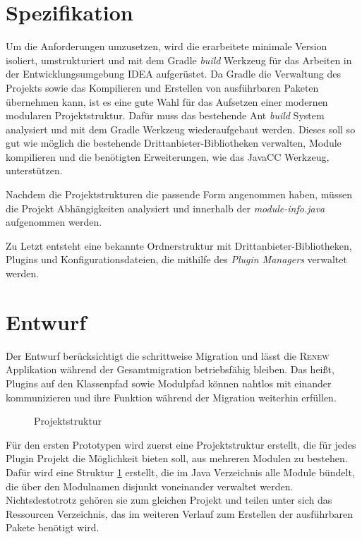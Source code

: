 \section{Spezifikation}
	Um die Anforderungen umzusetzen, wird die erarbeitete minimale Version isoliert, umstrukturiert und mit dem Gradle \textit{build} Werkzeug für das Arbeiten in der Entwicklungsumgebung IDEA aufgerüstet. Da Gradle die Verwaltung des Projekts sowie das Kompilieren und Erstellen von ausführbaren Paketen übernehmen kann, ist es eine gute Wahl für das Aufsetzen einer modernen modularen Projektstruktur.\newline 
	Dafür muss das bestehende Ant \textit{build} System analysiert und mit dem Gradle Werkzeug wiederaufgebaut werden. Dieses soll so gut wie möglich die bestehende Drittanbieter-Bibliotheken verwalten, Module kompilieren und die benötigten Erweiterungen, wie das JavaCC Werkzeug, unterstützen.\bigbreak

	Nachdem die Projektstrukturen die passende Form angenommen haben, müssen die Projekt Abhängigkeiten analysiert und innerhalb der \textit{module-info.java} aufgenommen werden.\bigbreak

	Zu Letzt entsteht eine bekannte Ordnerstruktur mit Drittanbieter-Bibliotheken, Plugins und Konfigurationsdateien, die mithilfe des \textit{Plugin Managers} verwaltet werden.

\section{Entwurf}
	Der Entwurf berücksichtigt die schrittweise Migration und lässt die \textsc{Renew} Applikation während der Gesamtmigration betriebsfähig bleiben. Das heißt, Plugins auf den Klassenpfad sowie Modulpfad können nahtlos mit einander kommunizieren und ihre Funktion während der Migration weiterhin erfüllen.\bigbreak

	\begin{figure}[h!]
		\centering
		\begin{minipage}{7cm}
		\end{minipage}
		\caption{Projektstruktur}
		\label{fig:projektstruktur}
	\end{figure}
	Für den ersten Prototypen wird zuerst eine Projektstruktur erstellt, die für jedes Plugin Projekt die Möglichkeit bieten soll, aus mehreren Modulen zu bestehen. Dafür wird eine Struktur \ref{fig:projektstruktur} erstellt, die im Java Verzeichnis alle Module bündelt, die über den Modulnamen disjunkt voneinander verwaltet werden. Nichtsdestotrotz gehören sie zum gleichen Projekt und teilen unter sich das Ressourcen Verzeichnis, das im weiteren Verlauf zum Erstellen der ausführbaren Pakete benötigt wird.\bigbreak
	       
